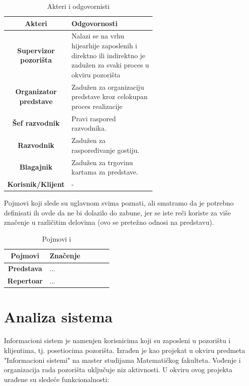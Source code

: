 \documentclass[a4paper]{article}
\begin{document}
\begin{table}[H]
  \centering
  \begin{tabular}{c|p{0.6\linewidth}}
    \textbf{Akteri} & \textbf{Odgovornosti} \\
    \hline
    \textbf{Supervizor pozorišta} & Nalazi se na vrhu hijearhije zaposlenih i direktno ili 
                                    indirektno je zadužen za svaki proces u okviru pozorišta \\
    \hline
    \textbf{Organizator predstave} & Zadužen za organizaciju predstave kroz celokupan proces realizacije \\
    \hline
    \textbf{Šef razvodnik} & Pravi raspored razvodnika. \\
    \hline
    \textbf{Razvodnik} & Zadužen za raspoređivanje gostiju. \\
    \hline
    \textbf{Blagajnik} & Zadužen za trgovinu kartama za predstave. \\
    \hline
    \textbf{Korisnik/Klijent} & - \\
  \end{tabular}
  \caption{Akteri i odgovornisti}
\end{table}

Pojmovi koji slede su uglavnom svima poznati, ali smatramo da je potrebno definisati ih ovde da 
ne bi dolazilo do zabune, jer se iste reči koriste za više značenje u različitim delovima (ovo se
pretežno odnosi na predstavu).

\begin{table}[H]
  \centering
  \begin{tabular}{c|p{0.6\linewidth}}
    \textbf{Pojmovi} & \textbf{Značenje} \\
    \hline
    \textbf{Predstava} & ... \\
    \hline
    \textbf{Repertoar} & ... \\
  \end{tabular}
  \caption{Pojmovi i}
\end{table}

\section{Analiza sistema}
Informacioni sistem je namenjen korisnicima koji su zaposleni u pozorištu i klijentima, tj. posetiocima 
pozorišta. Izrađen je kao projekat u okviru predmeta "Informacioni sistemi" na master studijama Matematičkog fakulteta. 
Vođenje i organizacija rada pozorišta uključuje niz aktivnosti. U okviru ovog projekta urađene su 
sledeće funkcionalnosti:
\end{document}
